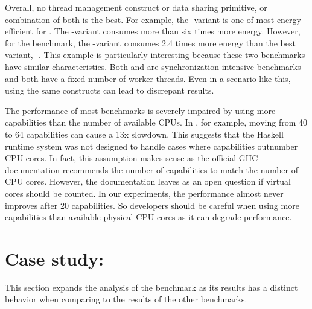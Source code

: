  Overall, no thread management construct or data sharing primitive, or combination of both is the best. For example, the \forkIO-\TMVar variant is one of most energy-efficient for \dining. The \forkOS-\TMVar variant consumes more than six times more energy. However, for the \chameneos benchmark, the \forkIO-\TMVar variant consumes 2.4 times more energy than the best variant, \forkIO-\MVar. This example is particularly interesting because these two benchmarks have similar characteristics. Both \dining and \chameneos are synchronization-intensive benchmarks and both have a fixed number of worker threads. Even in a scenario like this, using the same constructs can lead to discrepant results.
\newline

 The performance of most benchmarks is severely impaired by using more capabilities than the number of available CPUs. In \chameneos, for example, moving from 40 to 64 capabilities can cause a 13x slowdown. This suggests that the Haskell runtime system was not designed to handle cases where capabilities outnumber CPU cores. In fact, this assumption makes sense as the official GHC documentation recommends the number of capabilities to match the number of CPU cores. However, the documentation leaves as an open question if virtual cores should be counted. In our experiments, the performance almost never improves after 20 capabilities. So developers should be careful when using more capabilities than available physical CPU cores as it can degrade performance.


\section{Case study: \fasta}\label{sec:fasta}
This section expands the analysis of the \fasta benchmark as its results has a distinct behavior when comparing to the results of the other benchmarks.

